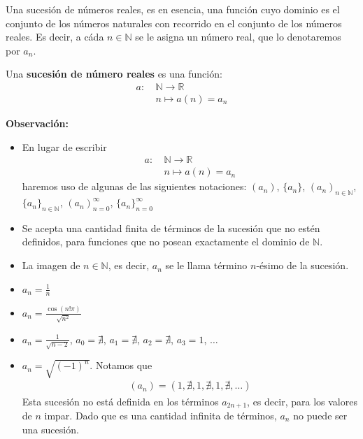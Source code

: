 \documentclass[12pt]{book}
\begin{document}
Una sucesión de números reales, es en esencia, una función cuyo dominio es el conjunto de los números naturales con recorrido en el conjunto de los números reales. Es decir, a cáda $n \in \mathbb{N}$ se le asigna un número real, que lo denotaremos por $a_n$.\\
\begin{defi}{}{}
    Una \textbf{sucesión de número reales} es una función:
    \begin{align*}
        a:\  &\mathbb{N} \longrightarrow \mathbb{R} \\
        &n \longmapsto a(n)=a_n
    \end{align*}
\end{defi}
\textbf{Observación:} 
\begin{itemize}
    \item En lugar de escribir 
\begin{align*}
     a:\  &\mathbb{N} \longrightarrow \mathbb{R} \\
        &n \longmapsto a(n)=a_n
\end{align*}
haremos uso de algunas de las siguientes notaciones: $(a_n)$, $\{a_n\}$, $(a_n)_{n \in \mathbb{N}}$, $\{a_n\}_{n \in \mathbb{N}}$, $(a_n)_{n=0}^\infty$, $\{a_n\}_{n=0}^\infty$

\item Se acepta una cantidad finita de términos de la sucesión que no estén definidos, para funciones que no posean exactamente el dominio de $\mathbb{N}$.

\item La imagen de $n \in \mathbb{N}$, es decir, $a_n$ se le llama término $n$-ésimo de la sucesión.
\end{itemize}

\begin{eje}{}{}
    \begin{itemize}
        \item $a_n= \displaystyle \frac{1}{n}$

        \item $a_n= \displaystyle \frac{\cos(n!\pi)}{\sqrt{n^2}}$

        \item $a_n= \displaystyle \frac{1}{\sqrt{n-2}}$, $a_0 = \nexists$, $a_1 = \nexists$, $a_2=\nexists$, $a_3=1$, $\ldots$

        \item $a_n= \sqrt{(-1)^n}$. Notamos que 
        \begin{align*}
            (a_n)=(1,\nexists, 1 , \nexists, 1, \nexists, \ldots )
        \end{align*}
        Esta sucesión no está definida en los términos $a_{2n+1}$, es decir, para los valores de $n$ impar. Dado que es una cantidad infinita de términos, $a_n$ no puede ser una sucesión.
    \end{itemize}
\end{eje}
\end{document}
